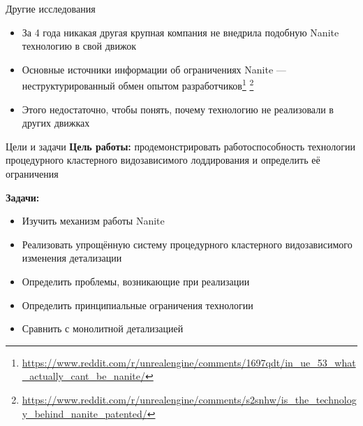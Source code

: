 \begin{frame}{Другие исследования}
    \begin{itemize}
        \item За 4 года никакая другая крупная компания не внедрила подобную Nanite технологию в свой движок
        \item Основные источники информации об ограничениях Nanite --- неструктурированный обмен опытом разработчиков\footnote{\url{https://www.reddit.com/r/unrealengine/comments/1697qdt/in_ue_53_what_actually_cant_be_nanite/}} \footnote{\url{https://www.reddit.com/r/unrealengine/comments/s2snhw/is_the_technology_behind_nanite_patented/}}
        \item Этого недостаточно, чтобы понять, почему технологию не реализовали в других движках
    \end{itemize}
\end{frame}

\begin{frame}{Цели и задачи}
    \textbf{Цель работы:}
    продемонстрировать работоспособность технологии процедурного кластерного видозависимого лоддирования и определить её ограничения

    \bigskip

    \textbf{Задачи:}
    \begin{itemize}
        \item Изучить механизм работы Nanite
        \item Реализовать упрощённую систему процедурного кластерного видозависимого изменения детализации
        \item Определить проблемы, возникающие при реализации
        \item Определить принципиальные ограничения технологии
        \item Сравнить с монолитной детализацией
    \end{itemize}
\end{frame}
